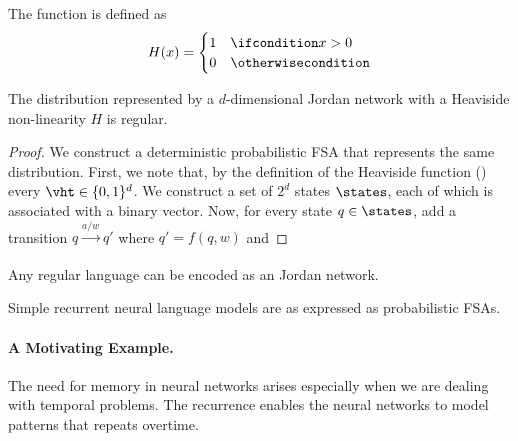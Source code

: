 \begin{definition}
The  function is defined as
\begin{equation}\label{eq:heaviside}
H(x) = \begin{cases} 1 & \ifcondition x > 0 \\
0 & \otherwisecondition
\end{cases}
\end{equation}
\end{definition}


\begin{lemma}
The distribution represented by a $d$-dimensional Jordan network with a Heaviside non-linearity $H$ is regular.
\end{lemma}
\begin{proof}
We construct a deterministic probabilistic FSA that represents the same distribution.
First, we note that, by the definition of the Heaviside function () every $\vht \in \{0, 1\}^d$. 
We construct a set of $2^d$ states $\states$, each of which is associated with a binary vector. 
Now, for every state $q \in \states$, add a transition $q \xrightarrow[]{a / w} q'$ where $q' = f(q, w)$ and 
\end{proof}

\begin{example}
\end{example}

\begin{example}
\end{example}

\begin{lemma}
Any regular language can be encoded as an Jordan network.
\end{lemma}


\begin{theorem}
Simple recurrent neural language models are as expressed as probabilistic FSAs.
\end{theorem}
 

\paragraph{A Motivating Example.}
The need for memory in neural networks arises especially when we are dealing with temporal problems. The recurrence enables the neural networks to model patterns that repeats overtime. 

